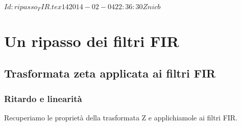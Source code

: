 %
%
\svnInfo $Id: ripasso_FIR.tex 14 2014-02-04 22:36:30Z nicb $

\chapter{Un ripasso dei filtri FIR\label{chap:ripasso}}

\section{Trasformata zeta applicata ai filtri FIR\label{sec:zeta fir}}

\subsection{Ritardo e linearit\`a\label{sec:ritardo e linearita}}

Recuperiamo le propriet\`a della trasformata Z e applichiamole ai filtri FIR.

